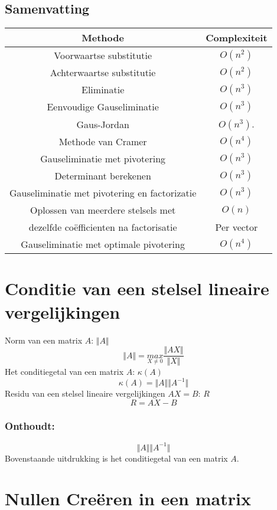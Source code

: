 \documentclass[samenvatting.tex]{subfiles}
\begin{document}
\subsection*{Samenvatting}
\begin{center}
\begin{tabular}{|c|c|}
\hline
Methode & Complexiteit\\
\hline
Voorwaartse substitutie & $O(n^2)$\\
Achterwaartse substitutie & $O(n^2)$\\
Eliminatie & $O(n^3)$\\
Eenvoudige Gauseliminatie & $O(n^3)$\\
Gaus-Jordan & $O(n^3)$.\\
Methode van Cramer & $O(n^4)$\\
Gauseliminatie met pivotering & $O(n^3)$\\
Determinant berekenen & $O(n^3)$\\
Gauseliminatie met pivotering en factorizatie & $O(n^3)$\\
Oplossen van meerdere stelsels met&$O(n)$\\ dezelfde co\"efficienten na factorisatie & Per vector\\
Gauseliminatie met optimale pivotering & $O(n^4)$\\
\hline
\end{tabular}
\end{center}

\section{Conditie van een stelsel lineaire vergelijkingen}
Norm van een matrix $A$: $\Vert A \Vert$
\[
\Vert A \Vert = \underset{X \neq 0}{max}\frac{\Vert AX \Vert}{\Vert X \Vert}
\]
Het conditiegetal van een matrix $A$: $\kappa(A)$
\[
\kappa(A) = \Vert A \Vert \Vert A^{-1} \Vert
\]
Residu van een stelsel lineaire vergelijkingen $AX=B$: $R$
\[
R = AX - B
\]

\subsubsection*{Onthoudt:}
\[
\Vert A\Vert\Vert A^{-1}\Vert
\]
Bovenstaande uitdrukking is het conditiegetal van een matrix $A$.

\section{Nullen Cre\"eren in een matrix}
\end{document}
